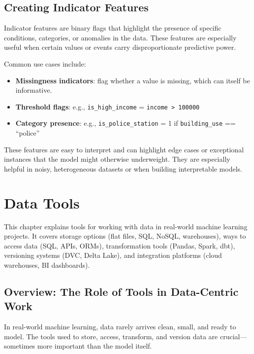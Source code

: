 \documentclass[12pt,openany]{book}
\begin{document}
\section{Creating Indicator Features}

Indicator features are binary flags that highlight the presence of specific conditions, categories, or anomalies in the data. These features are especially useful when certain values or events carry disproportionate predictive power.

Common use cases include:
\begin{itemize}
    \item \textbf{Missingness indicators}: flag whether a value is missing, which can itself be informative.
    \item \textbf{Threshold flags}: e.g., \texttt{is\_high\_income} = \texttt{income > 100000}
    \item \textbf{Category presence}: e.g., \texttt{is\_police\_station} = 1 if \texttt{building\_use} == ``police''
\end{itemize}

These features are easy to interpret and can highlight edge cases or exceptional instances that the model might otherwise underweight. They are especially helpful in noisy, heterogeneous datasets or when building interpretable models.




\chapter{Data Tools}

\begin{summarybox}
This chapter explains tools for working with data in real-world machine learning projects. It covers storage options (flat files, SQL, NoSQL, warehouses), ways to access data (SQL, APIs, ORMs), transformation tools (Pandas, Spark, dbt), versioning systems (DVC, Delta Lake), and integration platforms (cloud warehouses, BI dashboards). 
\end{summarybox}

\section{Overview: The Role of Tools in Data-Centric Work}

In real-world machine learning, data rarely arrives clean, small, and ready to model. The tools used to store, access, transform, and version data are crucial—sometimes more important than the model itself.
\end{document}

